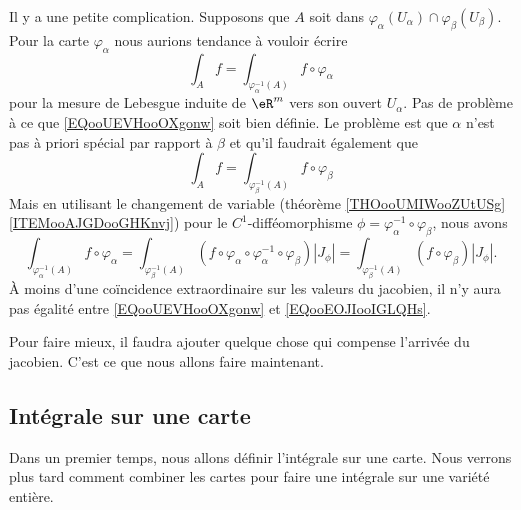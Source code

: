 Il y a une petite complication. Supposons que \( A\) soit dans \( \varphi_{\alpha}(U_{\alpha})\cap \varphi_{\beta}(U_{\beta})\). Pour la carte \( \varphi_{\alpha}\) nous aurions tendance à vouloir écrire
\begin{equation}        \label{EQooUEVHooOXgonw}
	\int_A f=\int_{\varphi_{\alpha}^{-1}(A)}f\circ \varphi_{\alpha}
\end{equation}
pour la mesure de Lebesgue induite de \( \eR^m\) vers son ouvert \( U_{\alpha}\). Pas de problème à ce que \eqref{EQooUEVHooOXgonw} soit bien définie. Le problème est que \( \alpha\) n'est pas à priori spécial par rapport à \( \beta\) et qu'il faudrait également que
\begin{equation}        \label{EQooEOJIooIGLQHs}
	\int_A f=\int_{\varphi_{\beta}^{-1}(A)}f\circ \varphi_{\beta}
\end{equation}
Mais en utilisant le changement de variable (théorème \ref{THOooUMIWooZUtUSg}\ref{ITEMooAJGDooGHKnvj}) pour le \( C^1\)-difféomorphisme \( \phi=\varphi_{\alpha}^{-1}\circ \varphi_{\beta}\), nous avons
\begin{equation}
	\int_{\varphi_{\alpha}^{-1}(A)}f\circ \varphi_{\alpha}
	=\int_{\varphi_{\beta}^{-1}(A)}(f\circ \varphi_{\alpha}\circ\varphi_{\alpha}^{-1}\circ\varphi_{\beta})| J_{\phi} |
	=\int_{\varphi_{\beta}^{-1}(A)}(f\circ \varphi_{\beta})| J_{\phi} |.
\end{equation}
À moins d'une coïncidence extraordinaire sur les valeurs du jacobien, il n'y aura pas égalité entre \eqref{EQooUEVHooOXgonw} et \eqref{EQooEOJIooIGLQHs}.

Pour faire mieux, il faudra ajouter quelque chose qui compense l'arrivée du jacobien. C'est ce que nous allons faire maintenant.

\subsection{Intégrale sur une carte}

Dans un premier temps, nous allons définir l'intégrale sur une carte. Nous verrons plus tard comment combiner les cartes pour faire une intégrale sur une variété entière.

